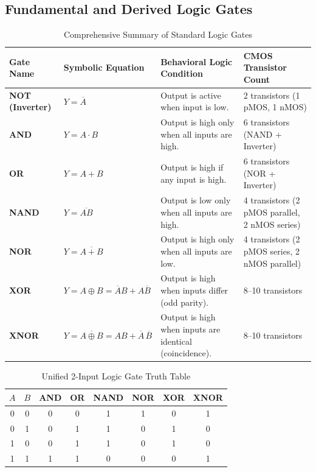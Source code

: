 \subsection{Fundamental and Derived Logic Gates}
\begin{table}[htbp]
\centering
\small
\caption{Comprehensive Summary of Standard Logic Gates}
\label{tab:standard_logic_gates}
\begin{tabularx}{\textwidth}{l >{\centering\arraybackslash}p{3.2cm} >{\centering\arraybackslash}p{2.8cm} X}
\toprule
\textbf{Gate Name} & \textbf{Symbolic Equation} & \textbf{Behavioral Logic Condition} & \textbf{CMOS Transistor Count} \\
\midrule
\textbf{NOT (Inverter)} & $Y = \overline{A}$ & Output is active when input is low. & 2 transistors (1 pMOS, 1 nMOS) \\
\textbf{AND} & $Y = A \cdot B$ & Output is high only when all inputs are high. & 6 transistors (NAND + Inverter) \\
\textbf{OR} & $Y = A + B$ & Output is high if any input is high. & 6 transistors (NOR + Inverter) \\
\textbf{NAND} & $Y = \overline{AB}$ & Output is low only when all inputs are high. & 4 transistors (2 pMOS parallel, 2 nMOS series) \\
\textbf{NOR} & $Y = \overline{A + B}$ & Output is high only when all inputs are low. & 4 transistors (2 pMOS series, 2 nMOS parallel) \\
\textbf{XOR} & $Y = A \oplus B = \overline{A}B + A\overline{B}$ & Output is high when inputs differ (odd parity). & 8--10 transistors \\
\textbf{XNOR} & $Y = \overline{A \oplus B} = AB + \overline{A}\,\overline{B}$ & Output is high when inputs are identical (coincidence). & 8--10 transistors \\
\bottomrule
\end{tabularx}
\end{table}

\begin{table}[htbp]
\centering
\small
\caption{Unified 2-Input Logic Gate Truth Table}
\label{tab:unified_truth_table}
\begin{tabular}{c c c c c c c c}
\toprule
$A$ & $B$ & \textbf{AND} & \textbf{OR} & \textbf{NAND} & \textbf{NOR} & \textbf{XOR} & \textbf{XNOR} \\
\midrule
0 & 0 & 0 & 0 & 1 & 1 & 0 & 1 \\
0 & 1 & 0 & 1 & 1 & 0 & 1 & 0 \\
1 & 0 & 0 & 1 & 1 & 0 & 1 & 0 \\
1 & 1 & 1 & 1 & 0 & 0 & 0 & 1 \\
\bottomrule
\end{tabular}
\end{table}

